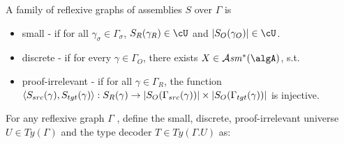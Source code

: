 \documentclass[12pt,a4paper]{article}
\def\cAsm{\mathcal{A}\mathit{sm}^*(\algA)}
\def\src{_{src}}
\def\rfl{_{refl}}
\def\tgt{_{tgt}}
\renewcommand{\O}{_{O}}\alwaysmath{O}
\newcommand{\R}{\ensuremath{_{R}}}
\begin{document}
A family of reflexive graphs of assemblies $S$ over $\Gamma$ is
\begin{itemize}
  \item small - if for all $\gamma_\sigma \in \Gamma_\sigma$, $S\R(\gamma\R) \in \cU$ and $\carr{S\O(\gamma\O)} \in \cU$.
  
  \item discrete - if for every $\gamma \in \Gamma\O$, there exists $X \in \cAsm$, s.t.
   
  
  \item proof-irrelevant - if for all $\gamma \in \Gamma\R$, the function $\langle S\src(\gamma), S\tgt(\gamma) \rangle : S\R(\gamma) \to \carr{S\O(\Gamma\src(\gamma))} \times \carr{S\O(\Gamma\tgt(\gamma))}$ is injective.
\end{itemize}
For any reflexive graph $\Gamma$ , define the small, discrete, proof-irrelevant universe $U \in Ty(\Gamma)$ and the type decoder $T \in Ty(\Gamma . U)$ as:
\end{document}
